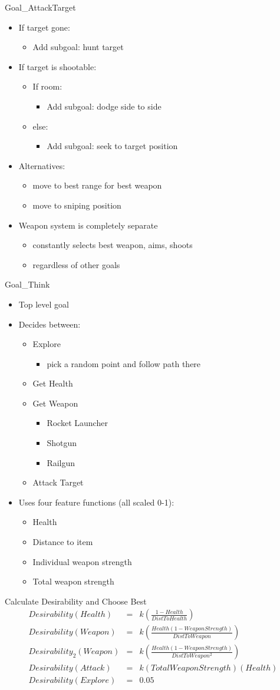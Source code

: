 \documentclass[t,compress]{beamer}
\newcommand{\bframe}[1]{\begin{frame}[fragile]{#1}}
\newcommand{\bi}{\begin{itemize}}
\newcommand{\ei}{\end{itemize}}
\begin{document}
\begin{centering}
\bframe{Goal\_AttackTarget}
\bi
\item If target gone:
  \bi \item Add subgoal: hunt target\ei
\item If target is shootable:
  \bi 
  \item If room:
    \bi
    \item Add subgoal: dodge side to side
    \ei
  \item else:
    \bi
    \item Add subgoal: seek to target position
    \ei
  \ei
\item Alternatives:
\bi\item move to best range for best weapon
\item move to sniping position
\ei
\item Weapon system is completely separate 
\bi\item  constantly 
  selects best weapon, aims, shoots
\item regardless of other goals
\ei
\ei

\end{frame}

\bframe{Goal\_Think}
\bi
\item Top level goal
\item Decides between:
  \bi
  \item Explore
\bi\item pick a random point and follow path there\ei
  \item Get Health
  \item Get Weapon
    \bi
    \item Rocket Launcher
    \item Shotgun
    \item Railgun
    \ei
  \item Attack Target
  \ei
  \item Uses four feature functions (all scaled 0-1):
    \bi
    \item Health
    \item Distance to item
    \item Individual weapon strength
    \item Total weapon strength
    \ei
\ei
\end{frame}

\bframe{Calculate Desirability and Choose Best}
\begin{eqnarray*}
Desirability(Health) &=& k\left(\frac{1-Health}{DistToHealth}\right)\\
Desirability(Weapon) &=& k\left(\frac{Health(1-WeaponStrength)}{DistToWeapon}\right)\\
Desirability_2(Weapon) &=& k\left(\frac{Health(1-WeaponStrength)}{DistToWeapon^2}\right)\\
Desirability(Attack) &=& k(TotalWeaponStrength)(Health)\\
Desirability(Explore) &=& 0.05
\end{eqnarray*}
\end{frame}


\end{centering}
\end{document}
